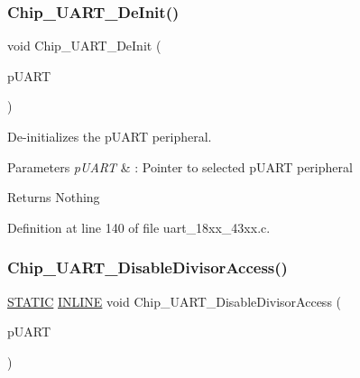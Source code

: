 \subsubsection{\texorpdfstring{Chip\+\_\+\+U\+A\+R\+T\+\_\+\+De\+Init()}{Chip\_UART\_DeInit()}}
{\footnotesize\ttfamily void Chip\+\_\+\+U\+A\+R\+T\+\_\+\+De\+Init (\begin{DoxyParamCaption}\item[{\hyperlink{struct_l_p_c___u_s_a_r_t___t}{L\+P\+C\+\_\+\+U\+S\+A\+R\+T\+\_\+T} $\ast$}]{p\+U\+A\+RT }\end{DoxyParamCaption})}



De-\/initializes the p\+U\+A\+RT peripheral. 


\begin{DoxyParams}{Parameters}
{\em p\+U\+A\+RT} & \+: Pointer to selected p\+U\+A\+RT peripheral \\
\hline
\end{DoxyParams}
\begin{DoxyReturn}{Returns}
Nothing 
\end{DoxyReturn}


Definition at line 140 of file uart\+\_\+18xx\+\_\+43xx.\+c.

\mbox{\label{group___u_a_r_t__18_x_x__43_x_x_ga81a3df6028c4b08dba38e4f6330d41d7}} 
\subsubsection{\texorpdfstring{Chip\+\_\+\+U\+A\+R\+T\+\_\+\+Disable\+Divisor\+Access()}{Chip\_UART\_DisableDivisorAccess()}}
{\footnotesize\ttfamily \hyperlink{group___l_p_c___types___public___macros_ga10b2d890d871e1489bb02b7e70d9bdfb}{S\+T\+A\+T\+IC} \hyperlink{spifi__18xx__43xx_8h_a2eb6f9e0395b47b8d5e3eeae4fe0c116}{I\+N\+L\+I\+NE} void Chip\+\_\+\+U\+A\+R\+T\+\_\+\+Disable\+Divisor\+Access (\begin{DoxyParamCaption}\item[{\hyperlink{struct_l_p_c___u_s_a_r_t___t}{L\+P\+C\+\_\+\+U\+S\+A\+R\+T\+\_\+T} $\ast$}]{p\+U\+A\+RT }\end{DoxyParamCaption})}




